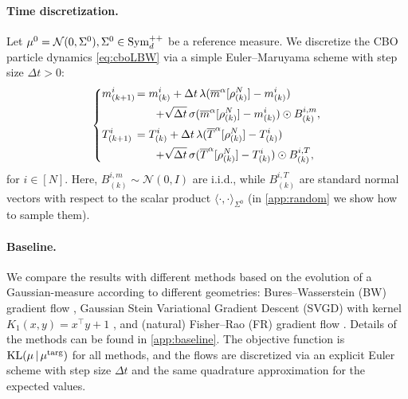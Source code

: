 \documentclass{article}
\theoremstyle{plain}
\theoremstyle{definition}
\theoremstyle{remark}
\newcommand{\pd}{\textup{Sym}^{++}_d}
\newcommand{\KL}{\textup{KL}}
\newcommand{\targ}{\textup{targ}}
\newcommand{\rev}{}
\begin{document}
\paragraph{Time discretization.} Let $\mu^0 = \mathcal{N}(0, \Sigma^0), \Sigma^0 \in \pd$ be a reference measure. We discretize the CBO particle dynamics \eqref{eq:cboLBW} via a simple Euler--Maruyama scheme with step size $\Delta t>0$:
\begin{equation} \label{eq:cbonum}
\begin{dcases}
m^i_{(k+1)}\hspace{-3mm} &= m^i_{(k)} + \Delta t\,\lambda(\overline{m}^\alpha[\rho^N_{(k)}] - m^i_{(k)}) \\
& \hspace{6mm} + \sqrt{\Delta t}\,\sigma (\overline{m}^\alpha[\rho^N_{(k)}] - m^i_{(k)})\odot  B_{(k)}^{i,m}, \\
T^i_{(k+1)} \hspace{-3mm} &= T^i_{(k)} + \Delta t\,\lambda(\overline{T}^\alpha[\rho^N_{(k)}] - T^i_{(k)}) \\
& \hspace{6mm} 
+ \sqrt{\Delta t}\,\sigma (\overline{T}^\alpha[\rho^N_{(k)}] - T^i_{(k)})\odot B_{(k)}^{i,T},
\end{dcases}
\end{equation}
for $i \in[N]$. Here, $B_{(k)}^{i,m} \sim \mathcal{N}(0, I)$ are i.i.d., while $B_{(k)}^{i,T}$ are standard normal vectors with respect to the scalar product $\langle \cdot, \cdot \rangle_{\Sigma^0}$ (in \cref{app:random} we show how to sample them).

\paragraph{Baseline.} 

We compare the results with \rev{different methods based on the evolution of a Gaussian-measure according to different geometries: Bures--Wasserstein (BW) gradient flow \cite{lambert2022variational}, Gaussian Stein Variational Gradient Descent (SVGD) with kernel $K_1(x,y)=x^\top y+1$ \cite{liu2023towards}, and (natural) Fisher--Rao (FR) gradient flow \cite{barfoot2020multivariate}. Details of the methods can be found in \cref{app:baseline}. The objective function is $\KL(\mu\,|\,\mu^\targ)$ for all methods, and the flows are discretized via an explicit Euler scheme with step size $\Delta t$ and the same quadrature approximation for the expected values.}
\end{document}
